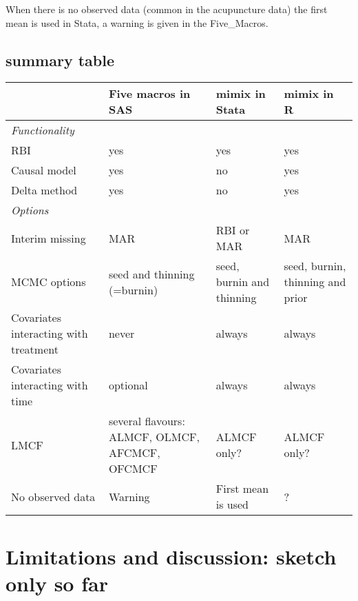 When there is no observed data (common in the acupuncture data) the first mean is used in Stata,
a warning is given in the Five\_Macros.

\subsection{summary table}

\begin{tabular}{p{}p{}p{}p{}}\hline
	&	Five macros in SAS	&	mimix in Stata	&	mimix in R	\\\hline
{\em Functionality}	&		&		&		\\
RBI	&	yes	&	yes	&	yes	\\
Causal model	&	yes	&	no	&	yes	\\
Delta method	&	yes	&	no	&	yes	\\\hline
{\em Options}	&		&		&		\\
Interim missing	&	MAR	&	RBI or MAR	&	MAR	\\
MCMC options	&	seed and thinning (=burnin)	&	seed, burnin and thinning	&	seed, burnin, thinning and prior	\\
Covariates interacting with treatment	&	never	&	always	&	always	\\
Covariates interacting with time	&	optional	&	always	&	always	\\
LMCF	&	several flavours: ALMCF, OLMCF, AFCMCF, OFCMCF	&	ALMCF only?	&	ALMCF only?	\\
No observed data	&	Warning	&	First mean is used	&	?	\\\hline
\end{tabular}




\section{Limitations and discussion: sketch only so far}

